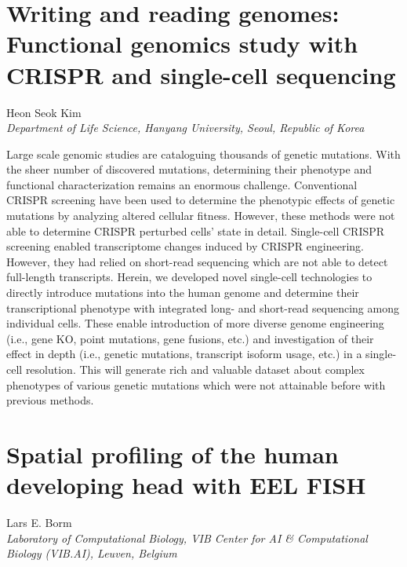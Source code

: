 \section*{Writing and reading genomes: \\ Functional genomics study with CRISPR and single-cell sequencing}

\begin{center}
Heon Seok Kim \\
\vspace{0.2cm}
\textit{Department of Life Science, Hanyang University, Seoul, Republic of Korea} \\
\end{center}

\noindent
Large scale genomic studies are cataloguing thousands of genetic mutations. With the sheer number of discovered mutations, determining their phenotype and functional characterization remains an enormous challenge. Conventional CRISPR screening have been used to determine the phenotypic effects of genetic mutations by analyzing altered cellular fitness. However, these methods were not able to determine CRISPR perturbed cells’ state in detail. Single-cell CRISPR screening enabled transcriptome changes induced by CRISPR engineering. However, they had relied on short-read sequencing which are not able to detect full-length transcripts. Herein, we developed novel single-cell technologies to directly introduce mutations into the human genome and determine their transcriptional phenotype with integrated long- and short-read sequencing among individual cells. These enable introduction of more diverse genome engineering (i.e., gene KO, point mutations, gene fusions, etc.) and investigation of their effect in depth (i.e., genetic mutations, transcript isoform usage, etc.) in a single-cell resolution. This will generate rich and valuable dataset about complex phenotypes of various genetic mutations which were not attainable before with previous methods.
\newpage

\section*{Spatial profiling of the human developing head with EEL FISH}

\begin{center}
Lars E. Borm \\
\vspace{0.2cm}
\textit{Laboratory of Computational Biology, VIB Center for AI \& Computational Biology (VIB.AI), Leuven, Belgium} \\
\end{center}

